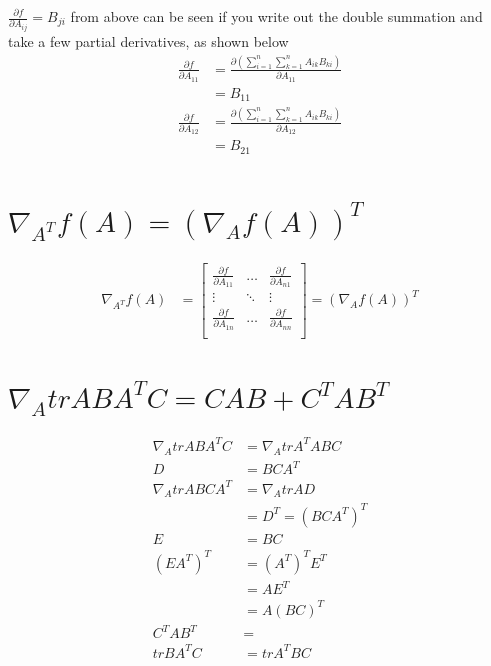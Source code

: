 \documentclass[a4paper, 12pt]{article}
\begin{document}
$\frac{\partial f}{\partial A_{ij}} = B_{ji}$ from above can be seen if you write out the double summation and take a few partial derivatives, as shown below
\begin{align*}
\frac{\partial f}{\partial A_{11}} &= \frac{\partial (\sum_{i=1}^{n}\sum_{k=1}^nA_{ik}B_{ki})}{\partial A_{11}}\\
&= B_{11}\\
\frac{\partial f}{\partial A_{12}} &= \frac{\partial (\sum_{i=1}^{n}\sum_{k=1}^nA_{ik}B_{ki})}{\partial A_{12}}\\
&= B_{21}\\
\end{align*}

\section{\(\nabla_{A^{T}}f(A) = (\nabla_{A}f(A))^{T}\)}

\begin{align*}
\nabla_{A^{T}}f(A) &= \left[
\begin{matrix}
\frac{\partial f}{\partial A_{11}} & \ldots & \frac{\partial f}{\partial A_{n1}}\\
\vdots & \ddots & \vdots\\
\frac{\partial f}{\partial A_{1n}} & \ldots & \frac{\partial f}{\partial A_{nn}}\\
\end{matrix}
\right] = (\nabla_{A}f(A))^{T}
\end{align*}

\section{\(\nabla_{A}trABA^{T}C = CAB + C^{T}AB^{T}\)}
\begin{align*}
\nabla_{A}trABA^{T}C &= \nabla_{A}trA^{T}ABC\\
D &= BCA^{T} \\
\nabla_{A}trABCA^{T} &= \nabla_{A}trAD  \\
&= D^{T} = (BCA^{T})^{T}\\
E &= BC \\
(EA^{T})^{T} &= (A^{T})^{T}E^{T}\\
&= AE^{T} \\
&= A(BC)^{T} \\
C^{T}AB^{T} &= \\
trBA^{T}C &= trA^{T}BC
\end{align*}
\end{document}
